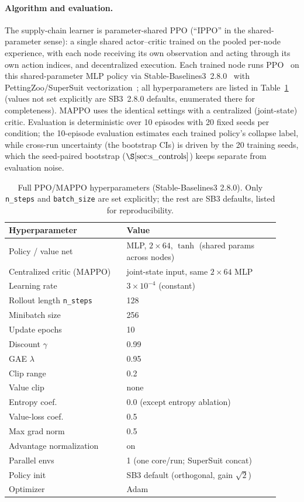 \documentclass[letterpaper]{article} %
\theoremstyle{plain}
\begin{document}
\paragraph{Algorithm and evaluation.}
The supply-chain learner is parameter-shared PPO (``IPPO'' in the shared-parameter sense): a single
shared actor--critic trained on the pooled per-node experience, with each node receiving its own
observation and acting through its own action indices, and decentralized execution. Each trained node
runs PPO~\citep{schulman2017ppo} on this shared-parameter MLP policy via
Stable-Baselines3~2.8.0~\citep{raffin2021sb3} with PettingZoo/SuperSuit
vectorization~\citep{terry2021pettingzoo,terry2020supersuit}; all hyperparameters are listed in
Table~\ref{tab:s_hparams} (values not set explicitly are SB3~2.8.0 defaults, enumerated there for
completeness). MAPPO uses the identical settings with a centralized (joint-state) critic. Evaluation
is deterministic over 10 episodes with 20 fixed seeds per condition; the 10-episode evaluation
estimates each trained policy's collapse label, while cross-run uncertainty (the bootstrap CIs) is
driven by the 20 training seeds, which the seed-paired bootstrap ($\S\ref{sec:s_controls}$) keeps
separate from evaluation noise.

\begin{table}[t]\centering\small
\caption{Full PPO/MAPPO hyperparameters (Stable-Baselines3 2.8.0). Only \texttt{n\_steps} and
\texttt{batch\_size} are set explicitly; the rest are SB3 defaults, listed for reproducibility.}
\label{tab:s_hparams}
\begin{tabular}{@{}p{0.40\linewidth}p{0.52\linewidth}@{}}
\toprule
Hyperparameter & Value \\
\midrule
Policy / value net & MLP, $2\times64$, $\tanh$ (shared params across nodes) \\
Centralized critic (MAPPO) & joint-state input, same $2\times64$ MLP \\
Learning rate & $3\times10^{-4}$ (constant) \\
Rollout length \texttt{n\_steps} & 128 \\
Minibatch size & 256 \\
Update epochs & 10 \\
Discount $\gamma$ & 0.99 \\
GAE $\lambda$ & 0.95 \\
Clip range & 0.2 \\
Value clip & none \\
Entropy coef. & 0.0 (except entropy ablation) \\
Value-loss coef. & 0.5 \\
Max grad norm & 0.5 \\
Advantage normalization & on \\
Parallel envs & 1 (one core/run; SuperSuit concat) \\
Policy init & SB3 default (orthogonal, gain $\sqrt2$) \\
Optimizer & Adam \\
\bottomrule
\end{tabular}
\end{table}
\end{document}
